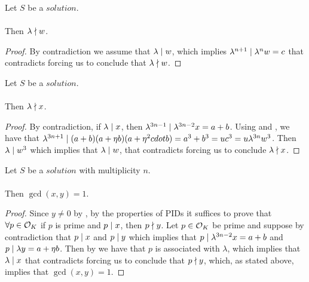 \begin{lemma}
    \label{lmm:lambda_not_dvd_w}
    \leanok
    Let $S$ be a $solution$.\\\\
    Then $\lambda \nmid w$.
\end{lemma}
\begin{proof}
    \leanok
    By contradiction we assume that $\lambda \mid w$, which implies
    $\lambda^{n+1} \mid \lambda^n  w = c$ that contradicts 
    forcing us to conclude that $\lambda \nmid w$.
\end{proof}

\begin{lemma}
    \label{lmm:lambda_not_dvd_x}
    \leanok
    Let $S$ be a $solution$.\\\\
    Then $\lambda \nmid x$.
\end{lemma}
\begin{proof}
    \leanok
    By contradiction, if $\lambda \mid x$, then
    $\lambda^{3n-1} \mid \lambda^{3n-2}  x = a+b$. Using 
    and , we have that $\lambda^{3n+1} \mid
    (a+b)  (a + \eta  b)  (a + \eta^2 cdot b) = a^3+b^3
    = u c^3 = u \lambda^{3n} w^3$.
    Then $\lambda \mid w^3$ which implies that $\lambda \mid w$, that
    contradicts  forcing us to conclude $\lambda \nmid x$.
\end{proof}

\begin{lemma}
    \label{lmm:coprime_x_y}
    \leanok
    Let $S$ be a $solution$ with multiplicity $n$.\\\\
    Then $\gcd(x,y) = 1$.
\end{lemma}
\begin{proof}
    \leanok
    Since $y \neq 0$ by , by the properties of PIDs it suffices to prove that
    $\forall p \in \mathcal{O}_K$ if $p$ is prime and $p \mid x$, then $p \nmid y$.
    Let $p \in \mathcal{O}_K$ be prime and suppose by contradiction that $p \mid x$ and $p \mid y$
    which implies that $p \mid \lambda^{3n-2} x = a+b$ and $p \mid \lambda y = a + \eta b$.
    Then by 
    we have that $p$ is associated with $\lambda$, which implies that $\lambda \mid x$
    that contradicts  forcing us to conclude that $p \nmid y$, which,
    as stated above, implies that $\gcd(x,y)=1$.
\end{proof}

